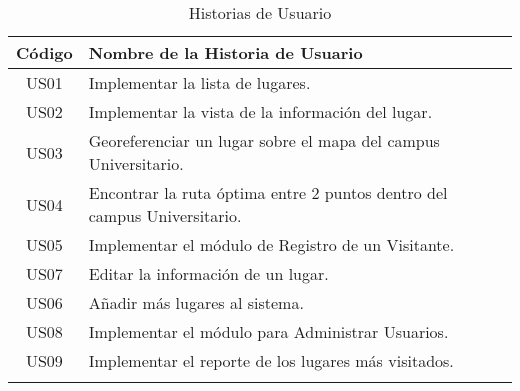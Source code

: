 \begin{table}[H]

  \begin{center}
    \begin{tabularx}{0.75\textwidth}{ c X }

      \toprule
        \textbf{C\'odigo} &
        \textbf{Nombre de la Historia de Usuario} \\

      \midrule
      \addlinespace
      US01 & Implementar la lista de lugares.\\

      \addlinespace
      US02 & Implementar la vista de la información del lugar.\\

      \addlinespace
      US03 & Georeferenciar un lugar sobre el mapa del campus Universitario.\\
      \addlinespace
      US04 & Encontrar la ruta óptima entre 2 puntos dentro del campus Universitario.\\
      \addlinespace
      US05 & Implementar el módulo de Registro de un Visitante.\\
      \addlinespace
      US07 & Editar la información de un lugar.\\
      \addlinespace
      US06 & Añadir más lugares al sistema.\\
      \addlinespace
      US08 & Implementar el módulo para Administrar Usuarios.\\
      \addlinespace
      US09 & Implementar el reporte de los lugares más visitados.\\
      \addlinespace

      \bottomrule
    \end{tabularx}

    \caption{Historias de Usuario}
    \label{tab:us_table}
%
  \end{center}
\end{table}

